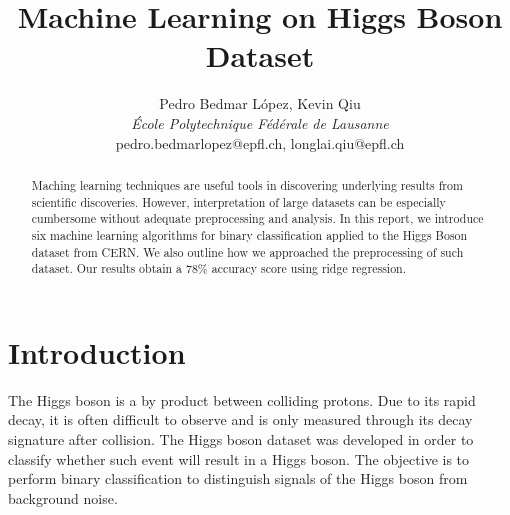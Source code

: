 \documentclass[10pt,conference,compsocconf]{IEEEtran}
\begin{document}
\title{Machine Learning on Higgs Boson Dataset}

\author{
  {Pedro Bedmar L\'opez, Kevin Qiu} \\
  \textit{École Polytechnique Fédérale de Lausanne} \\
  pedro.bedmarlopez@epfl.ch, longlai.qiu@epfl.ch}
\maketitle

\begin{abstract}
  Maching learning techniques are useful tools in discovering underlying results from scientific discoveries. However, interpretation of large datasets can be especially cumbersome without adequate preprocessing and analysis. In this report, we introduce six machine learning algorithms for binary classification applied to the Higgs Boson dataset from CERN. We also outline how we approached the preprocessing of such dataset. Our results obtain a 78\% accuracy score using ridge regression.
  
\end{abstract}

\section{Introduction}
\label{sec:intro}

The Higgs boson is a by product between colliding protons. Due to its rapid decay, it is often difficult to observe and is only measured through its decay signature after collision\cite{higgs}. The Higgs boson dataset was developed in order to classify whether such event will result in a Higgs boson\cite{higgs}. The objective is to perform binary classification to distinguish signals of the Higgs boson from background noise.

\end{document}
